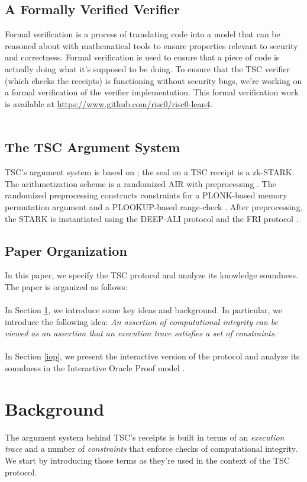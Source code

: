 \documentclass[10pt,letterpaper,titlepage]{article}
\theoremstyle{definition}
\begin{document}
\subsection{A Formally Verified Verifier}
Formal verification is a process of translating code into a model that can be reasoned about with mathematical tools to ensure properties relevant to security and correctness.
Formal verification is used to ensure that a piece of code is actually doing what it's supposed to be doing. 
To ensure that the TSC verifier (which checks the receipts) is functioning without security bugs, we're working on a formal verification of the verifier implementation. 
This formal verification work is available at \url{https://www.github.com/risc0/risc0-lean4}.\\
\\
\subsection{The TSC Argument System}
TSC's argument system is based on \cite{stark}; 
the seal on a TSC receipt is a zk-STARK.
The arithmetization scheme is a randomized AIR with preprocessing \cite{RAP}.
The randomized preprocessing constructs constraints for a PLONK-based memory permutation argument and a PLOOKUP-based range-check \cite{plonk, plookup}.
After preprocessing, the STARK is instantiated using the DEEP-ALI protocol and the FRI protocol \cite{deepFRI, fri}.

\subsection{Paper Organization}
In this paper, we specify the TSC protocol and analyze its knowledge soundness. 
The paper is organized as follows:\\
\\
In Section \ref{background}, we introduce some key ideas and background. 
In particular, we introduce the following idea: 
\textit{An assertion of computational integrity can be viewed as an assertion that an execution trace satisfies a set of constraints.}\\
\\
In Section \ref{iop}, we present the interactive version of the protocol and analyze its soundness in the Interactive Oracle Proof model \cite{iop}. \\
\section{Background}
\label{background}
The argument system behind TSC's receipts is built in terms of an \textit{execution trace} and a number of \textit{constraints} that enforce checks of computational integrity.
We start by introducing those terms as they're used in the context of the TSC protocol.
\end{document}
